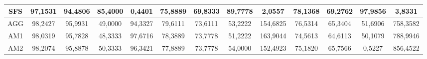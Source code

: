 \documentclass[12pt]{article}
\begin{document}
\begin{table}[H]
{\begin{tabular}{|c|cccc|cccc|cccc|}
SFS  & \multicolumn{1}{c|}{97,1531}                                                  & \multicolumn{1}{c|}{94,4806}                                                 & \multicolumn{1}{c|}{85,4000} & 0,4401  & \multicolumn{1}{c|}{75,8889}                                                  & \multicolumn{1}{c|}{69,8333}                                                 & \multicolumn{1}{c|}{89,7778} & 2,0557   & \multicolumn{1}{c|}{78,1368}                                                  & \multicolumn{1}{c|}{69,2762}                                                 & \multicolumn{1}{c|}{97,9856} & 3,8331   \\ \hline
AGG  & \multicolumn{1}{c|}{98,2427}                                                  & \multicolumn{1}{c|}{95,9931}                                                 & \multicolumn{1}{c|}{49,0000} & 94,3327 & \multicolumn{1}{c|}{79,6111}                                                  & \multicolumn{1}{c|}{73,6111}                                                 & \multicolumn{1}{c|}{53,2222} & 154,6825 & \multicolumn{1}{c|}{76,5314}                                                  & \multicolumn{1}{c|}{65,3404}                                                 & \multicolumn{1}{c|}{51,6906} & 758,3582 \\ \hline
AM1  & \multicolumn{1}{c|}{98,0319}                                                  & \multicolumn{1}{c|}{95,7828}                                                 & \multicolumn{1}{c|}{48,3333} & 97,6716 & \multicolumn{1}{c|}{78,3889}                                                  & \multicolumn{1}{c|}{73,7778}                                                 & \multicolumn{1}{c|}{51,2222} & 163,9044 & \multicolumn{1}{c|}{74,5613}                                                  & \multicolumn{1}{c|}{64,6113}                                                 & \multicolumn{1}{c|}{50,1079} & 788,9946 \\ \hline
AM2  & \multicolumn{1}{c|}{98,2074}                                                  & \multicolumn{1}{c|}{95,8878}                                                 & \multicolumn{1}{c|}{50,3333} & 96,3421 & \multicolumn{1}{c|}{77,8889}                                                  & \multicolumn{1}{c|}{73,7778}                                                 & \multicolumn{1}{c|}{54,0000} & 152,4923 & \multicolumn{1}{c|}{75,1820}                                                  & \multicolumn{1}{c|}{65,7566}                                                 & \multicolumn{1}{c|}{0,5227}  & 856,4522 \\ \hline

\end{tabular}}
\end{table}
\end{document}
